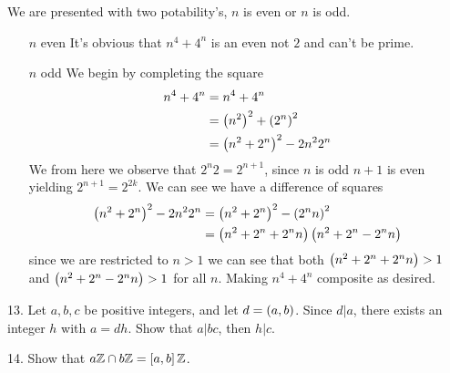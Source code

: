 \begin{mdframed}[style=darkAnswer,frametitle={Joe Starr}]
We are presented with two potability's, $n$ is even or $n$ is odd.
\begin{itemize}[align=left]
    \item [$n$ even]{\hspace{.5in}\newline
        It's obvious that $n^4+4^n$ is an even not $2$ and can't be prime. 
    }
    \item [$n$ odd]{\hspace{.5in}\newline
    We begin by completing the square 
    \begin{align*}
        n^4+4^n&= n^4+4^n\\
        &=\left(n^2\right)^2+\left(2^n\right)^2\\
        &=\left(n^2+2^n\right)^2-2n^2 2^n
    \end{align*}
    We from here we observe that $2^n2=2^{n+1}$, since $n$ is odd $n+1$ is even 
    yielding $2^{n+1}=2^{2k}$. We can see we have a difference of squares
    \begin{align*}
        \left(n^2+2^n\right)^2-2n^2 2^n&=\left(n^2+2^n\right)^2-\left(2^nn\right)^2\\
        &=\left(n^2+2^n+2^nn\right)\left(n^2+2^n-2^nn\right)
    \end{align*}
    since we are restricted to $n>1$ we can see that both $\left(n^2+2^n+2^nn\right)>1$
    and $\left(n^2+2^n-2^nn\right)>1$ for all $n$. Making $n^4+4^n$ composite as 
    desired. 
    }
\end{itemize}
\end{mdframed}
\newpage
\begin{mdframed}[style=darkQuesion]
13. Let $a,b,c$  be positive integers, and let $d=\left(a,b\right)$. Since $d\vert a$, 
there exists an integer $h$ with $a=dh$. Show that $a\vert bc$, then $h\vert c$. 
\end{mdframed}

\begin{mdframed}[style=darkAnswer,frametitle={Joe Starr}]
    
\end{mdframed}
\newpage
\begin{mdframed}[style=darkQuesion]
14. Show that $a\mathbb{Z} \cap b\mathbb{Z}=\left[a,b\right]\mathbb{Z}$.
\end{mdframed}

